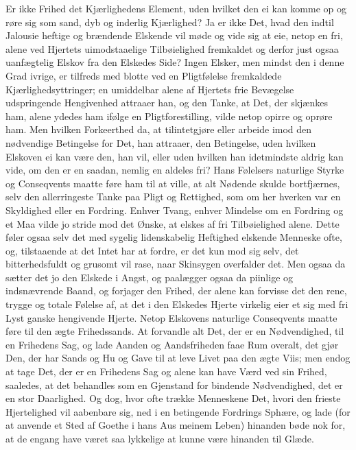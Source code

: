 \documentclass[12pt,a4paper]{book}
\newcommand{\apage}[1]{\marginnote{\footnotesize\textit{[#1]}}}
\begin{document}
Er ikke Frihed det Kjærlighedens Element, uden hvilket den ei kan komme
op og røre sig som sand, dyb og inderlig Kjærlighed? Ja er ikke Det,
hvad den \apage{123} indtil Jalousie heftige og brændende Elskende vil møde og vide
sig at eie, netop en fri, alene ved Hjertets uimodstaaelige
Tilbøielighed fremkaldet og derfor just ogsaa uanfægtelig Elskov fra den
Elskedes Side? Ingen Elsker, men mindst den i denne Grad ivrige, er
tilfreds med blotte ved en Pligtfølelse fremkaldede Kjærlighedsyttringer;
en umiddelbar alene af Hjertets frie Bevægelse udspringende Hengivenhed
attraaer han, og den Tanke, at Det, der skjænkes ham, alene ydedes ham
ifølge en Pligtforestilling, vilde netop opirre og oprøre ham. Men
hvilken Forkeerthed da, at tilintetgjøre eller arbeide imod den
nødvendige Betingelse for Det, han attraaer, den Betingelse, uden
hvilken Elskoven ei kan være den, han vil, eller uden hvilken han
idetmindste aldrig kan vide, om den er en saadan, nemlig en aldeles fri?
Hans Følelsers naturlige Styrke og Conseqvents maatte føre ham til at
ville, at alt Nødende skulde bortfjærnes, selv den allerringeste Tanke
paa Pligt og Rettighed, som om her hverken var en Skyldighed eller en
Fordring. Enhver Tvang, enhver Mindelse om en Fordring og et Maa vilde
jo stride mod det Ønske, at elskes af fri Tilbøielighed alene. Dette
føler ogsaa selv det med sygelig lidenskabelig Heftighed elskende
Menneske ofte, og, tilstaaende at det Intet har at fordre, er det kun
mod sig selv, det bitterhedsfuldt og grusomt vil rase, naar Skinsygen
overfalder det. Men ogsaa da sætter det jo den Elskede i Angst, og
paalægger ogsaa da piinlige og indsnævrende \apage{124} Baand, og forjager den
Frihed, der alene kan forvisse det den rene, trygge og totale Følelse
af, at det i den Elskedes Hjerte virkelig eier et sig med fri Lyst
ganske hengivende Hjerte. Netop Elskovens naturlige Conseqvents maatte
føre til den ægte Frihedssands. At forvandle alt Det, der er en
Nødvendighed, til en Frihedens Sag, og lade Aanden og Aandsfriheden faae
Rum overalt, det gjør Den, der har Sands og Hu og Gave til at leve Livet
paa den ægte Viis; men endog at tage Det, der er en Frihedens Sag og
alene kan have Værd ved sin Frihed, saaledes, at det behandles som en
Gjenstand for bindende Nødvendighed, det er en stor Daarlighed. Og dog,
hvor ofte trække Menneskene Det, hvori den frieste Hjertelighed vil
aabenbare sig, ned i en betingende Fordrings Sphære, og lade (for at
anvende et Sted af Goethe i hans Aus meinem Leben) hinanden bøde nok
for, at de engang have været saa lykkelige at kunne være hinanden til
Glæde.
\end{document}
